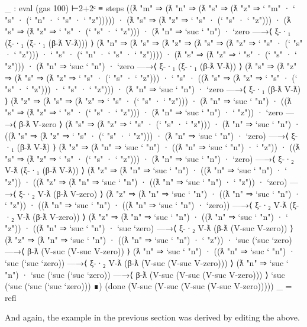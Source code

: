 \begin{fence}
\begin{code}
_ : eval (gas 100) ⊢2+2ᶜ ≡
  steps
   ((ƛ "m" ⇒
     (ƛ "n" ⇒
      (ƛ "s" ⇒ (ƛ "z" ⇒ ` "m" · ` "s" · (` "n" · ` "s" · ` "z")))))
    · (ƛ "s" ⇒ (ƛ "z" ⇒ ` "s" · (` "s" · ` "z")))
    · (ƛ "s" ⇒ (ƛ "z" ⇒ ` "s" · (` "s" · ` "z")))
    · (ƛ "n" ⇒ `suc ` "n")
    · `zero
   —→⟨ ξ-·₁ (ξ-·₁ (ξ-·₁ (β-ƛ V-ƛ))) ⟩
    (ƛ "n" ⇒
     (ƛ "s" ⇒
      (ƛ "z" ⇒
       (ƛ "s" ⇒ (ƛ "z" ⇒ ` "s" · (` "s" · ` "z"))) · ` "s" ·
       (` "n" · ` "s" · ` "z"))))
    · (ƛ "s" ⇒ (ƛ "z" ⇒ ` "s" · (` "s" · ` "z")))
    · (ƛ "n" ⇒ `suc ` "n")
    · `zero
   —→⟨ ξ-·₁ (ξ-·₁ (β-ƛ V-ƛ)) ⟩
    (ƛ "s" ⇒
     (ƛ "z" ⇒
      (ƛ "s" ⇒ (ƛ "z" ⇒ ` "s" · (` "s" · ` "z"))) · ` "s" ·
      ((ƛ "s" ⇒ (ƛ "z" ⇒ ` "s" · (` "s" · ` "z"))) · ` "s" · ` "z")))
    · (ƛ "n" ⇒ `suc ` "n")
    · `zero
   —→⟨ ξ-·₁ (β-ƛ V-ƛ) ⟩
    (ƛ "z" ⇒
     (ƛ "s" ⇒ (ƛ "z" ⇒ ` "s" · (` "s" · ` "z"))) · (ƛ "n" ⇒ `suc ` "n")
     ·
     ((ƛ "s" ⇒ (ƛ "z" ⇒ ` "s" · (` "s" · ` "z"))) · (ƛ "n" ⇒ `suc ` "n")
      · ` "z"))
    · `zero
   —→⟨ β-ƛ V-zero ⟩
    (ƛ "s" ⇒ (ƛ "z" ⇒ ` "s" · (` "s" · ` "z"))) · (ƛ "n" ⇒ `suc ` "n")
    ·
    ((ƛ "s" ⇒ (ƛ "z" ⇒ ` "s" · (` "s" · ` "z"))) · (ƛ "n" ⇒ `suc ` "n")
     · `zero)
   —→⟨ ξ-·₁ (β-ƛ V-ƛ) ⟩
    (ƛ "z" ⇒ (ƛ "n" ⇒ `suc ` "n") · ((ƛ "n" ⇒ `suc ` "n") · ` "z")) ·
    ((ƛ "s" ⇒ (ƛ "z" ⇒ ` "s" · (` "s" · ` "z"))) · (ƛ "n" ⇒ `suc ` "n")
     · `zero)
   —→⟨ ξ-·₂ V-ƛ (ξ-·₁ (β-ƛ V-ƛ)) ⟩
    (ƛ "z" ⇒ (ƛ "n" ⇒ `suc ` "n") · ((ƛ "n" ⇒ `suc ` "n") · ` "z")) ·
    ((ƛ "z" ⇒ (ƛ "n" ⇒ `suc ` "n") · ((ƛ "n" ⇒ `suc ` "n") · ` "z")) ·
     `zero)
   —→⟨ ξ-·₂ V-ƛ (β-ƛ V-zero) ⟩
    (ƛ "z" ⇒ (ƛ "n" ⇒ `suc ` "n") · ((ƛ "n" ⇒ `suc ` "n") · ` "z")) ·
    ((ƛ "n" ⇒ `suc ` "n") · ((ƛ "n" ⇒ `suc ` "n") · `zero))
   —→⟨ ξ-·₂ V-ƛ (ξ-·₂ V-ƛ (β-ƛ V-zero)) ⟩
    (ƛ "z" ⇒ (ƛ "n" ⇒ `suc ` "n") · ((ƛ "n" ⇒ `suc ` "n") · ` "z")) ·
    ((ƛ "n" ⇒ `suc ` "n") · `suc `zero)
   —→⟨ ξ-·₂ V-ƛ (β-ƛ (V-suc V-zero)) ⟩
    (ƛ "z" ⇒ (ƛ "n" ⇒ `suc ` "n") · ((ƛ "n" ⇒ `suc ` "n") · ` "z")) ·
    `suc (`suc `zero)
   —→⟨ β-ƛ (V-suc (V-suc V-zero)) ⟩
    (ƛ "n" ⇒ `suc ` "n") · ((ƛ "n" ⇒ `suc ` "n") · `suc (`suc `zero))
   —→⟨ ξ-·₂ V-ƛ (β-ƛ (V-suc (V-suc V-zero))) ⟩
    (ƛ "n" ⇒ `suc ` "n") · `suc (`suc (`suc `zero))
   —→⟨ β-ƛ (V-suc (V-suc (V-suc V-zero))) ⟩
    `suc (`suc (`suc (`suc `zero)))
   ∎)
   (done (V-suc (V-suc (V-suc (V-suc V-zero)))))
_ = refl
\end{code}
\end{fence}

And again, the example in the previous section was derived by editing
the above.

